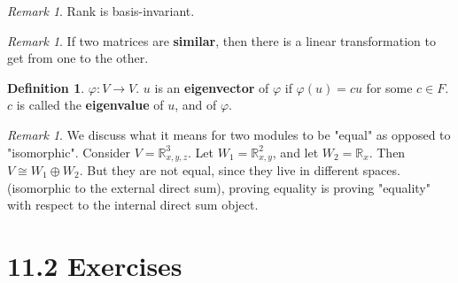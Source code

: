 \documentclass[9pt,reqno,twoside]{amsbook}
\theoremstyle{plain}
\numberwithin{section}{chapter}
\numberwithin{equation}{chapter}
\theoremstyle{definition}
\newtheorem{Def}[theorem]{Definition}
\theoremstyle{remark}
\newtheorem{rem}[theorem]{Remark}
\theoremstyle{plain}
\newcommand{\R}{\mathbb{R}}
\renewcommand{\phi}{\varphi}
\begin{document}
\begin{rem}
Rank is basis-invariant. 
\end{rem}

\begin{rem}
If two matrices are \textbf{similar}, then there is a linear transformation to get from one to the other. 
\end{rem}

\begin{Def}
$\phi:V \to V$. $u$ is an \textbf{eigenvector} of $\phi$ if $\phi(u) = cu$ for some $c \in F$. $c$ is called the \textbf{eigenvalue} of $u$, and of $\phi$. 
\end{Def}

\begin{rem}
We discuss what it means for two modules to be "equal" as opposed to "isomorphic". Consider $V = \R_{x,y,z}^3$. Let $W_1 = \R_{x,y}^2$, and let $W_2 = \R_x$. Then $V \cong W_1 \oplus W_2$. But they are not equal, since they live in different spaces. (isomorphic to the external direct sum), proving equality is proving "equality" with respect to the internal direct sum object. 
\end{rem}




\section*{11.2 Exercises}
\end{document}
